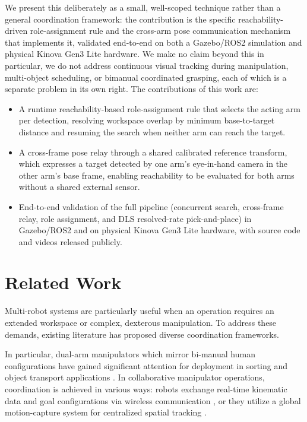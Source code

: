 \documentclass[letterpaper, 10 pt, conference]{ieeeconf}  %
\begin{document}
We present this deliberately as a small, well-scoped technique rather than a general coordination framework: the contribution is the specific reachability-driven
role-assignment rule and the cross-arm pose communication mechanism that implements it,
validated end-to-end on both a Gazebo/ROS2 simulation and physical Kinova Gen3 Lite hardware. We make no claim beyond this in particular, we do not address continuous visual tracking during manipulation, multi-object scheduling, or bimanual coordinated grasping, each of which is a separate problem in its own right. The contributions of this work are:
\begin{itemize}
\item A runtime reachability-based role-assignment rule that selects the acting arm per detection, resolving workspace overlap by minimum base-to-target distance and resuming the search when neither arm can reach the target.

\item A cross-frame pose relay through a shared calibrated reference transform, which expresses a target detected by one arm's eye-in-hand camera in the other arm's base frame, enabling reachability to be evaluated for both arms without a shared external sensor.

\item End-to-end validation of the full pipeline (concurrent search, cross-frame relay, role assignment, and DLS resolved-rate pick-and-place) in Gazebo/ROS2 and on physical Kinova Gen3 Lite hardware, with source code and videos released publicly.
\end{itemize}
\section{Related Work}
Multi-robot systems are particularly useful when an operation requires an extended workspace or complex, dexterous manipulation. To address these demands, existing literature has proposed diverse coordination frameworks.

In particular, dual-arm manipulators which mirror bi-manual human configurations have gained significant attention for deployment in sorting and object transport applications \cite{surya2025iapf, prajapati2025kinematics}. In collaborative manipulator operations, coordination is achieved in various ways: robots exchange real-time kinematic data \cite{ORTENZI2018110} and goal configurations via wireless communication \cite{10891400}, or they utilize a global motion-capture system for centralized spatial tracking \cite{10843915}.
\end{document}
